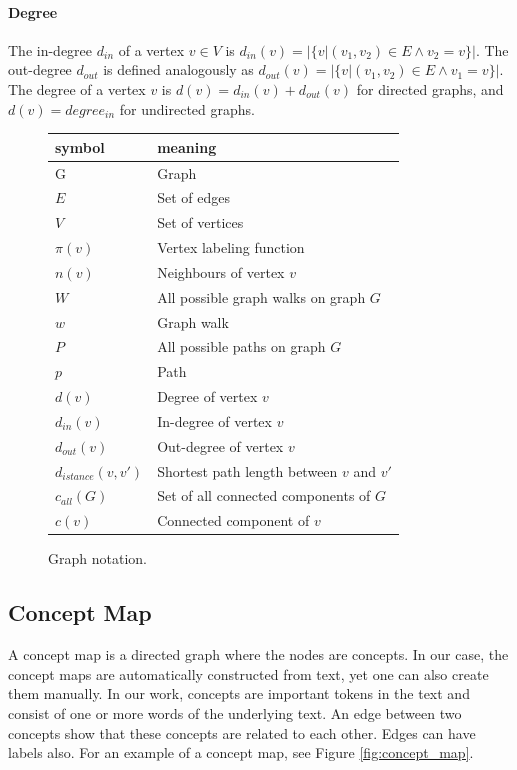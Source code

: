 \paragraph{Degree}
The in-degree $d_{in}$ of a vertex $v \in V$ is $d_{in}(v) = |\{v | (v_1, v_2) \in E \land v_2 = v\}|$.
The out-degree $d_{out}$ is defined analogously as $d_{out}(v) = |\{v | (v_1, v_2) \in E \land v_1 = v\}|$.
The degree of a vertex $v$ is $d(v) = d_{in}(v) + d_{out}(v)$ for directed graphs, and $d(v) = degree_{in}$ for undirected graphs.

\begin{figure}[htb!]
\centering
\begin{tabular}{ll}
\toprule
symbol &  meaning \\
\midrule
G & Graph \\
$E$ & Set of edges \\
$V$ & Set of vertices \\
$\pi(v)$ & Vertex labeling function \\
$n(v)$ & Neighbours of vertex $v$ \\
$W$ & All possible graph walks on graph $G$ \\
$w$ & Graph walk \\
$P$ & All possible paths on graph $G$ \\
$p$ & Path \\
$d(v)$ & Degree of vertex $v$ \\
$d_{in}(v)$ & In-degree of vertex $v$ \\
$d_{out}(v)$ & Out-degree of vertex $v$ \\
$d_{istance}(v, v')$ & Shortest path length between $v$ and $v'$ \\
$c_{all}(G)$ & Set of all connected components of $G$ \\
$c(v)$ & Connected component of $v$ \\
\end{tabular}
\caption[Notation: Graphs]{Graph notation.}
\end{figure}

\subsection{Concept Map}
A concept map \cite{Novak1984, Kinchin2000, Falke2017b,Gulrandhe2015, Valerio2008} is a directed graph where the nodes are concepts. In our case, the concept maps are automatically constructed from text, yet one can also create them manually.
In our work, concepts are important tokens in the text and consist of one or more words of the underlying text.
An edge between two concepts show that these concepts are related to each other. Edges can have labels also.
For an example of a concept map, see Figure \ref{fig:concept_map}.

